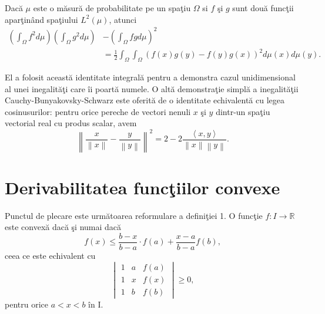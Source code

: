 \documentclass[a4paper,12pt,oneside]{report}
\begin{document}
Dac\u{a} \(\mu\) este o m\u{a}sur\u{a} de probabilitate pe un spa\c{t}iu \(\Omega\) si \(f\) \c{s}i \(g\) sunt dou\u{a} func\c{t}ii apar\c{t}in\^{a}nd spa\c{t}iului \(L^{2}\left ( \mu  \right )\), atunci
\begin{displaymath}
\begin{split}
  \left (\int_{\Omega}f^{2}d\mu \right )\left (\int_{\Omega}g^{2}d\mu \right ) &- \left (\int_{\Omega}fgd\mu \right )^{2}\\
   &= \frac{1}{2}\int_{\Omega}\int_{\Omega}\left ( f\left ( x \right )g\left ( y \right ) - f\left ( y \right )g\left ( x \right )\right )^{2}d\mu \left ( x \right )d\mu \left ( y \right ).
  \end{split}
\end{displaymath}
  
  El a folosit aceast\u{a} identitate integral\u{a} pentru a demonstra cazul unidimensional al unei inegalit\u{a}\c{t}i care \^{i}i poart\u{a} numele. O alt\u{a} demonstra\c{t}ie simpl\u{a} a inegalit\u{a}\c{t}ii Cauchy-Bunyakovsky-Schwarz este oferit\u{a}  de o identitate echivalent\u{a} cu legea cosinusurilor: pentru orice pereche de vectori nenuli \(x\) \c{s}i \(y\) dintr-un spa\c{t}iu vectorial real cu produs scalar, avem
\begin{displaymath}
  \left \| \frac{x}{\left \| x \right \|} - \frac{y}{\left \| y \right \|}\right \|^{2} = 2 - 2\frac{\left \langle x , y \right \rangle}{\left \| x \right \|\left \| y \right \|}.
\end{displaymath}

\section{Derivabilitatea func\c{t}iilor convexe}

Punctul de plecare este urm\u{a}toarea reformulare a defini\c{t}iei 1. O func\c{t}ie \(f : I \rightarrow \mathbb{R}\) este convex\u{a} dac\u{a} \c{s}i numai dac\u{a}
\begin{displaymath}
   f\left ( x \right ) \leq \frac{b - x}{b - a} \cdot f\left ( a \right ) + \frac{x- a}{b - a}f\left ( b \right ), \label{eq:1.10} \tag{1.10}
\end{displaymath}
ceea ce este echivalent cu
\begin{displaymath}
   \begin{vmatrix}
1 &  a& f\left ( a \right )\\
 1&  x& f\left ( x \right )\\
 1&  b& f\left ( b \right )
\end{vmatrix} \geq 0,
\label{eq:1.11} \tag{1.11}
\end{displaymath}
pentru orice \(a< x< b\) \^{i}n I. 
\end{document}
